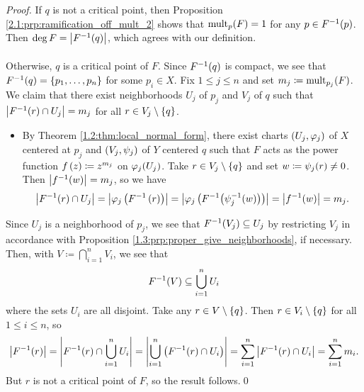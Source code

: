\documentclass[../Moduli_Spaces_of_Riemann_Surfaces.tex]{subfiles}
\begin{document}
    \begin{proof}
        If $q$ is not a critical point, then Proposition \ref{2.1:prp:ramification_off_mult_2} shows that $\operatorname{mult}_p\!\left(F\right)=1$ for any $p\in F^{-1}\!\left(p\right)$. Then $\deg F=\left|F^{-1}\!\left(q\right)\right|$, which agrees with our definition.\\\ \\
        Otherwise, $q$ is a critical point of $F$. Since $F^{-1}\!\left(q\right)$ is compact, we see that $F^{-1}\!\left(q\right)=\left\{p_1,\dots,p_n\right\}$ for some $p_i\in X$. Fix $1\leq j\leq n$ and set $m_j\coloneqq\operatorname{mult}_{p_j}\!\left(F\right)$. We claim that there exist neighborhoods $U_j$ of $p_j$ and $V_j$ of $q$ such that $\left|F^{-1}\!\left(r\right)\cap U_j\right|=m_j$ for all $r\in V_j\setminus\left\{q\right\}$.
        \begin{itemize}
            \item By Theorem \ref{1.2:thm:local_normal_form}, there exist charts $\left(U_j,\varphi_j\right)$ of $X$ centered at $p_j$ and $\left(V_j,\psi_j\right)$ of $Y$ centered $q$ such that $F$ acts as the power function $f\left(z\right)\coloneqq z^{m_j}$ on $\varphi_j\!\left(U_j\right)$. Take $r\in V_j\setminus\left\{q\right\}$ and set $w\coloneqq\psi_j\!\left(r\right)\neq0$. Then $\left|f^{-1}\!\left(w\right)\right|=m_j$, so we have
                \begin{equation*}
                    \left|F^{-1}\!\left(r\right)\cap U_j\right|=\left|\varphi_j\left(F^{-1}\left(r\right)\right)\right|=\left|\varphi_j\left(F^{-1}\!\left(\psi_j^{-1}\!\left(w\right)\right)\right)\right|=\left|f^{-1}\!\left(w\right)\right|=m_j.
                \end{equation*}
        \end{itemize}
        Since $U_j$ is a neighborhood of $p_j$, we see that $F^{-1}\!\left(V_j\right)\subseteq U_j$ by restricting $V_j$ in accordance with Proposition \ref{1.3:prp:proper_give_neighborhoods}, if necessary. Then, with $V\coloneqq\bigcap_{i=1}^{n}V_i$, we see that
        \begin{equation*}
            F^{-1}\!\left(V\right)\subseteq\bigcup_{i=1}^{n}U_i
        \end{equation*}
        where the sets $U_i$ are all disjoint. Take any $r\in V\setminus\left\{q\right\}$. Then $r\in V_i\setminus\left\{q\right\}$ for all $1\leq i\leq n$, so
        \begin{equation*}
            \left|F^{-1}\!\left(r\right)\right|=\left|F^{-1}\!\left(r\right)\cap\bigcup_{i=1}^{n}U_i\right|=\left|\bigcup_{i=1}^{n}\left(F^{-1}\!\left(r\right)\cap U_i\right)\right|=\sum_{i=1}^{n}\left|F^{-1}\!\left(r\right)\cap U_i\right|=\sum_{i=1}^{n}m_i.
        \end{equation*}
        But $r$ is not a critical point of $F$, so the result follows.\qed
    \end{proof}
\end{document}

